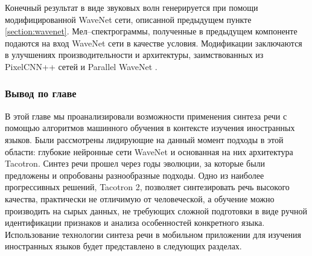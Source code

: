 Конечный результат в виде звуковых волн генерируется при помощи модифицированной WaveNet сети, описанной предыдущем пункте \ref{section:wavenet}. Мел--спектрограммы, полученные в предыдущем компоненте подаются на вход WaveNet сети в качестве условия. Модификации заключаются в улучшениях производительности и архитектуры, заимствованных из PixelCNN++ сетей \cite{salimans2017pixelcnn++} и Parallel WaveNet \cite{oord2018parallel}.

\subsubsection{Вывод по главе}
В этой главе мы проанализировали возможности применения синтеза речи с помощью алгоритмов машинного обучения в контексте изучения иностранных языков. Были рассмотрены лидирующие на данный момент подходы в этой области: глубокие нейронные сети WaveNet и основанная на них архитектура Tacotron. Синтез речи прошел через годы эволюции, за которые были предложены и опробованы разнообразные подходы. Одно из наиболее прогрессивных решений, Tacotron 2, позволяет синтезировать речь высокого качества, практически не отличимую от человеческой, а обучение можно производить на сырых данных, не требующих сложной подготовки в виде ручной идентификации признаков и анализа особенностей конкретного языка. Использование технологии синтеза речи в мобильном приложении для изучения иностранных языков будет представлено в следующих разделах.